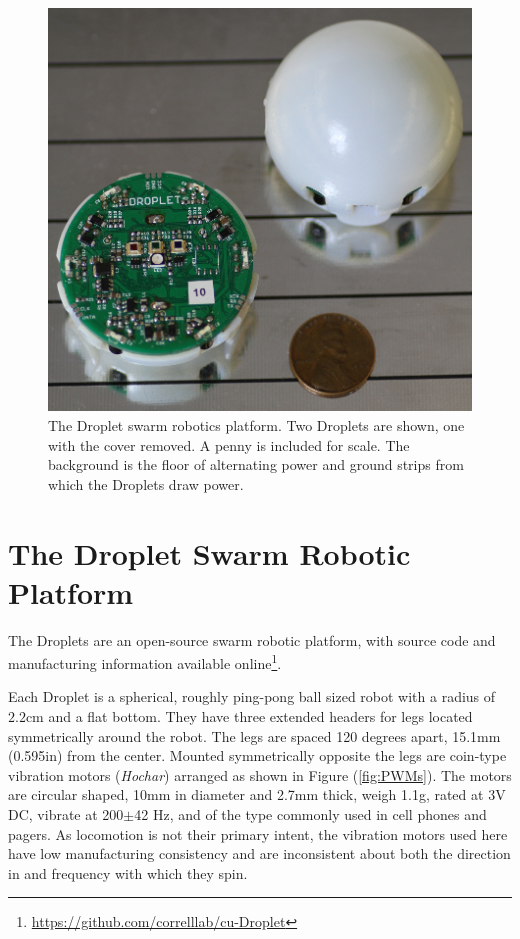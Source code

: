 \documentclass[letterpaper, 10pt, conference]{ieeeconf}
\begin{document}
\begin{figure}[!htb]
	\centering
		\includegraphics[width=0.8\columnwidth]{./Images/Droplets.png}
	\caption{The Droplet swarm robotics platform. Two Droplets are shown, one with the cover removed. A penny is included for scale. The background is the floor of alternating power and ground strips from which the Droplets draw power.}
	\label{Droplets}
\end{figure}


\section{The Droplet Swarm Robotic Platform}
The Droplets are an open-source swarm robotic platform, with source code and manufacturing information available online\footnote{\url{https://github.com/correlllab/cu-Droplet}}. 

Each Droplet is a spherical, roughly ping-pong ball sized robot with a radius of $2.2$cm and a flat bottom. They have three extended headers for legs located symmetrically around the robot. The legs are spaced 120 degrees apart, 15.1mm (0.595in) from the center. Mounted symmetrically opposite the legs are coin-type vibration motors (\emph{Hochar}) arranged as shown in Figure (\ref{fig:PWMs}). The  motors  are circular shaped, 10mm in diameter and 2.7mm thick, weigh 1.1g, rated at 3V DC, vibrate at 200$\pm$42 Hz, and of the type commonly used in cell phones and pagers. As locomotion is not their primary intent, the vibration motors used here have low manufacturing consistency and are inconsistent about both the direction in and frequency with which they spin.
\end{document}
